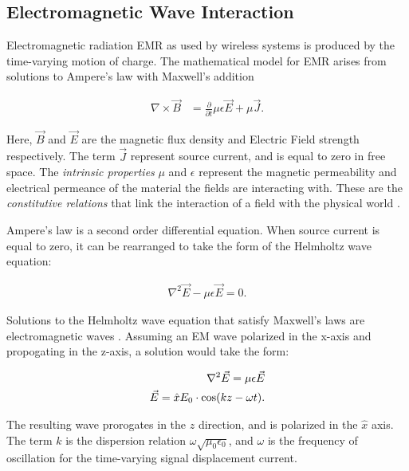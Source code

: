 	\subsection{Electromagnetic Wave Interaction}
	\label{sec:EM}

		Electromagnetic radiation EMR as used by wireless systems is produced by the time-varying motion of charge. The mathematical model for EMR arises from solutions to Ampere's law with Maxwell's addition

		\begin{align}
			\nabla \times \vec{B} &= \frac{\partial}{\partial t} \mu \epsilon \vec{E} + \mu \vec{J} \label{eq:AMP}.
		\end{align}

		Here, $\vec{B}$ and $\vec{E}$ are the magnetic flux density and Electric Field strength respectively. The term $\vec{J}$ represent source current, and is equal to zero in free space. The \textit{intrinsic properties} $\mu$ and $\epsilon$ represent the magnetic permeability and electrical permeance of the material the fields are interacting with. These are the \textit{constitutive relations} that link the interaction of a field with the physical world \cite{KONG}.

		Ampere's law is a second order differential equation. When source current is equal to zero, it can be rearranged to take the form of the Helmholtz wave equation:

		\begin{align}
			\nabla^2 \vec E - \mu \epsilon \vec{E} = 0 \label{eq:helm_wave}.
		\end{align}

		Solutions to the Helmholtz wave equation that satisfy Maxwell's laws are electromagnetic waves \cite{KONG}. Assuming an EM wave polarized in the x-axis and propogating in the z-axis, a solution would take the form:

		\begin{align}\label{eq:wave_sol}
			\nabla^2 \vec E   = \mu \epsilon \vec{E} \notag\\
			\vec{E} = \hat{x}E_0\cdot \cos(kz - \omega t).
		\end{align}

		The resulting wave prorogates in the $z$ direction, and is polarized in the $\hat{x}$ axis. The term $k$ is the dispersion relation $\omega\sqrt{\mu_0 \epsilon_0}$, and $\omega$ is the frequency of oscillation for the time-varying signal displacement current.

